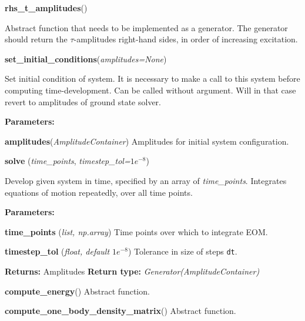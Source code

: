 \begin{tcolorbox}
{    \hspace{2em} \textbf{rhs\_t\_amplitudes}()
        \begin{adjustwidth}{4em}{}
        Abstract function that needs to be implemented as a generator. The generator 
        should return the $\tau$-amplitudes right-hand sides, in order of 
        increasing excitation.
        \end{adjustwidth}

    \hspace{2em} \textbf{set\_initial\_conditions}(\emph{amplitudes=None})
        \begin{adjustwidth}{4em}{}
        Set initial condition of system. It is necessary to make a call to 
        this system before computing time-development. Can be called without 
        argument. Will in that case revert to amplitudes of ground state solver.

        \textbf{Parameters: }

            \hspace{1.5em} \textbf{amplitudes}(\emph{AmplitudeContainer})
                Amplitudes for initial system configuration.
        \end{adjustwidth}

    \hspace{2em} \textbf{solve} (\emph{time\_points}, \emph{timestep\_tol=$1e^{-8}$})
        \begin{adjustwidth}{4em}{}
        Develop given system in time, specified by an array of \emph{time\_points}.
        Integrates equations of motion repeatedly, over all time points.
        
        \textbf{Parameters:}

            \hspace{1.5em} \textbf{time\_points} (\emph{list, np.array})
                Time points over which to integrate EOM.

            \hspace{1.5em} \textbf{timestep\_tol} (\emph{float, default $1e^{-8}$})
                Tolerance in size of steps \lstinline{dt}.

        \textbf{Returns:} Amplitudes
        \textbf{Return type:} \emph{Generator(AmplitudeContainer)}
        \end{adjustwidth}

    \hspace{2em} \textbf{compute\_energy}() Abstract function.
    
    \hspace{2em} \textbf{compute\_one\_body\_density\_matrix}() Abstract function.
    
}
\end{tcolorbox}
